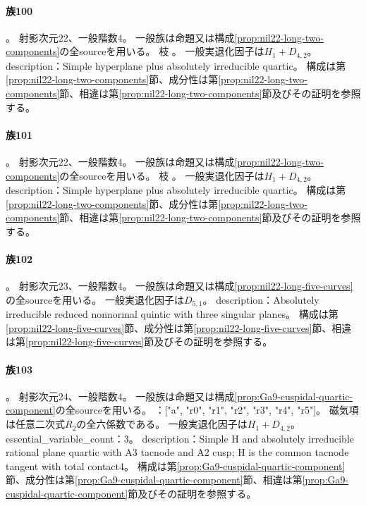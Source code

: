 \paragraph{族100}\label{catalogue:R4_NIL22_LONG_HYPERPLANE_QUARTIC_CUBIC_22}
。
射影次元$22$、一般階数$4$。
一般族は命題又は構成\ref{prop:nil22-long-two-components}の全sourceを用いる。
枝 。
一般実退化因子は$H_{1}+D_{4,2}$。
description：Simple hyperplane plus absolutely irreducible quartic。
構成は第\ref{prop:nil22-long-two-components}節、成分性は第\ref{prop:nil22-long-two-components}節、相違は第\ref{prop:nil22-long-two-components}節及びその証明を参照する。

\paragraph{族101}\label{catalogue:R4_NIL22_LONG_HYPERPLANE_QUARTIC_QUADRATIC_22}
。
射影次元$22$、一般階数$4$。
一般族は命題又は構成\ref{prop:nil22-long-two-components}の全sourceを用いる。
枝 。
一般実退化因子は$H_{1}+D_{4,2}$。
description：Simple hyperplane plus absolutely irreducible quartic。
構成は第\ref{prop:nil22-long-two-components}節、成分性は第\ref{prop:nil22-long-two-components}節、相違は第\ref{prop:nil22-long-two-components}節及びその証明を参照する。

\paragraph{族102}\label{catalogue:R4_NIL22_LONG_IRREDUCIBLE_QUINTIC_23}
。
射影次元$23$、一般階数$4$。
一般族は命題又は構成\ref{prop:nil22-long-five-curves}の全sourceを用いる。
一般実退化因子は$D_{5,1}$。
description：Absolutely irreducible reduced nonnormal quintic with three singular planes。
構成は第\ref{prop:nil22-long-five-curves}節、成分性は第\ref{prop:nil22-long-five-curves}節、相違は第\ref{prop:nil22-long-five-curves}節及びその証明を参照する。

\paragraph{族103}\label{catalogue:R4_GA9_CUSPIDAL_PLANE_QUARTIC_24}
。
射影次元$24$、一般階数$4$。
一般族は命題又は構成\ref{prop:Ga9-cuspidal-quartic-component}の全sourceを用いる。
：["a", "r0", "r1", "r2", "r3", "r4", "r5"]。
磁気項は任意二次式$R_2$の全六係数である。
一般実退化因子は$H_{1}+D_{4,2}$。
essential\_variable\_count：3。
description：Simple H and absolutely irreducible rational plane quartic with A3 tacnode and A2 cusp; H is the common tacnode tangent with total contact4。
構成は第\ref{prop:Ga9-cuspidal-quartic-component}節、成分性は第\ref{prop:Ga9-cuspidal-quartic-component}節、相違は第\ref{prop:Ga9-cuspidal-quartic-component}節及びその証明を参照する。

